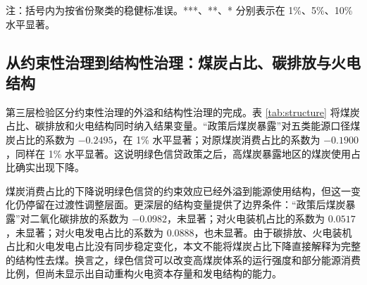 \documentclass[UTF8,12pt]{ctexart}
\begin{document}
\begin{table}[htbp]
    \centering
    \caption{绿色信贷与污染治理：约束性治理的第二层证据}
    \label{tab:pollution}
    \begin{flushleft}
    \footnotesize 注：括号内为按省份聚类的稳健标准误。***、**、* 分别表示在 1\%、5\%、10\% 水平显著。
    \end{flushleft}
\end{table}

\subsection{从约束性治理到结构性治理：煤炭占比、碳排放与火电结构}

第三层检验区分约束性治理的外溢和结构性治理的完成。表 \ref{tab:structure} 将煤炭占比、碳排放和火电结构同时纳入结果变量。“政策后煤炭暴露”对五类能源口径煤炭占比的系数为 $-0.2495$，在 1\% 水平显著；对原煤炭消费占比的系数为 $-0.1900$，同样在 1\% 水平显著。这说明绿色信贷政策之后，高煤炭暴露地区的煤炭使用占比确实出现下降。

煤炭消费占比的下降说明绿色信贷的约束效应已经外溢到能源使用结构，但这一变化仍停留在过渡性调整层面。更深层的结构变量提供了边界条件：“政策后煤炭暴露”对二氧化碳排放的系数为 $-0.0982$，未显著；对火电装机占比的系数为 $0.0517$，未显著；对火电发电占比的系数为 $0.0888$，也未显著。由于碳排放、火电装机占比和火电发电占比没有同步稳定变化，本文不能将煤炭占比下降直接解释为完整的结构性去煤。换言之，绿色信贷可以改变高煤炭体系的运行强度和部分能源消费比例，但尚未显示出自动重构火电资本存量和发电结构的能力。
\end{document}
